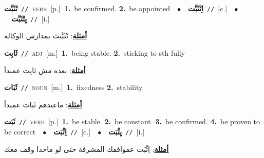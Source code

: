 \documentclass[10pt,a4paper,twoside]{article} %
\begin{document}
\begin{multicols}{2}
{\setlength\topsep{0pt}\textbf{\foreignlanguage{arabic}{تْثَبَّت}}\ {\color{gray}\texttt{//}\color{black}}\ \textsc{verb}\ [p.]\ \textbf{1.}~be confirmed.  \textbf{2.}~be appointed\ \ $\bullet$\ \ \setlength\topsep{0pt}\textbf{\foreignlanguage{arabic}{اِتْثَبَّت}}\ {\color{gray}\texttt{//}\color{black}}\ [c.]\ \ $\bullet$\ \ \setlength\topsep{0pt}\textbf{\foreignlanguage{arabic}{يِتْثَبَّت}}\ {\color{gray}\texttt{//}\color{black}}\ [i.]\  \begin{flushright}\color{gray}\foreignlanguage{arabic}{\textbf{\underline{\foreignlanguage{arabic}{أمثلة}}}: تْثَبَّتت بمدارس الوكالة}\end{flushright}\color{black}} \vspace{2mm}

{\setlength\topsep{0pt}\textbf{\foreignlanguage{arabic}{ثَابِت}}\ {\color{gray}\texttt{//}\color{black}}\ \textsc{adj}\ [m.]\ \textbf{1.}~being stable.  \textbf{2.}~sticking to sth fully\  \begin{flushright}\color{gray}\foreignlanguage{arabic}{\textbf{\underline{\foreignlanguage{arabic}{أمثلة}}}: بعده مش ثابِت عمبدأ}\end{flushright}\color{black}} \vspace{2mm}

{\setlength\topsep{0pt}\textbf{\foreignlanguage{arabic}{ثَبَات}}\ {\color{gray}\texttt{//}\color{black}}\ \textsc{noun}\ [m.]\ \textbf{1.}~fixedness  \textbf{2.}~stability\  \begin{flushright}\color{gray}\foreignlanguage{arabic}{\textbf{\underline{\foreignlanguage{arabic}{أمثلة}}}: ماعندهم ثَبات عمبدأ}\end{flushright}\color{black}} \vspace{2mm}

{\setlength\topsep{0pt}\textbf{\foreignlanguage{arabic}{ثَبَت}}\ {\color{gray}\texttt{//}\color{black}}\ \textsc{verb}\ [p.]\ \textbf{1.}~be stable.  \textbf{2.}~be constant.  \textbf{3.}~be confirmed.  \textbf{4.}~be proven to be correct\ \ $\bullet$\ \ \setlength\topsep{0pt}\textbf{\foreignlanguage{arabic}{اِثْبَت}}\ {\color{gray}\texttt{//}\color{black}}\ [c.]\ \ $\bullet$\ \ \setlength\topsep{0pt}\textbf{\foreignlanguage{arabic}{يِثْبَت}}\ {\color{gray}\texttt{//}\color{black}}\ [i.]\  \begin{flushright}\color{gray}\foreignlanguage{arabic}{\textbf{\underline{\foreignlanguage{arabic}{أمثلة}}}: اِثْبَت عمواقفك المشرفة حتى لو ماحدا وقف معك}\end{flushright}\color{black}} \vspace{2mm}


\end{multicols}
\end{document}
